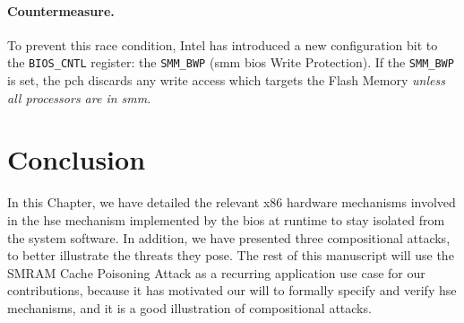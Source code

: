 \paragraph{Countermeasure.}
%
To prevent this race condition, Intel has introduced a new configuration bit to
the \texttt{BIOS\_CNTL} register: the \texttt{SMM\_BWP} (\ac{smm} \ac{bios}
Write Protection).
%
If the \texttt{SMM\_BWP} is set, the \ac{pch} discards any write access which
targets the Flash Memory \emph{unless all processors are in \ac{smm}}.

\section{Conclusion}
\label{sec:usecase:conclusion}

In this Chapter,  we have detailed the relevant x86 hardware mechanisms involved
in the \ac{hse} mechanism implemented by the \ac{bios} at runtime to stay
isolated from the system software.
%
In addition, we have presented three compositional attacks, to better illustrate
the threats they pose.
%
The rest of this manuscript will use the SMRAM Cache Poisoning Attack as a
recurring application use case for our contributions, because it has motivated
our will to formally specify and verify \ac{hse} mechanisms, and it is a good
illustration of compositional attacks.
